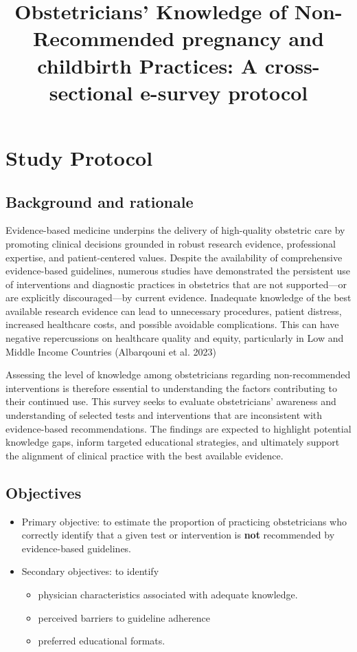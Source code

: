 \documentclass[
  letterpaper,
  DIV=11,
  numbers=noendperiod]{scrartcl}
\title{Obstetricians' Knowledge of Non-Recommended pregnancy and
childbirth Practices: A cross-sectional e-survey protocol}
\author{}
\date{}
\begin{document}
\maketitle


\section{Study Protocol}\label{study-protocol}

\subsection{Background and rationale}\label{background-and-rationale}

Evidence-based medicine underpins the delivery of high-quality obstetric
care by promoting clinical decisions grounded in robust research
evidence, professional expertise, and patient-centered values. Despite
the availability of comprehensive evidence-based guidelines, numerous
studies have demonstrated the persistent use of interventions and
diagnostic practices in obstetrics that are not supported---or are
explicitly discouraged---by current evidence. Inadequate knowledge of
the best available research evidence can lead to unnecessary procedures,
patient distress, increased healthcare costs, and possible avoidable
complications. This can have negative repercussions on healthcare
quality and equity, particularly in Low and Middle Income Countries
(Albarqouni et al. 2023)

Assessing the level of knowledge among obstetricians regarding
non-recommended interventions is therefore essential to understanding
the factors contributing to their continued use. This survey seeks to
evaluate obstetricians' awareness and understanding of selected tests
and interventions that are inconsistent with evidence-based
recommendations. The findings are expected to highlight potential
knowledge gaps, inform targeted educational strategies, and ultimately
support the alignment of clinical practice with the best available
evidence.

\subsection{Objectives}\label{objectives}

\begin{itemize}
\item
  Primary objective: to estimate the proportion of practicing
  obstetricians who correctly identify that a given test or intervention
  is \textbf{not} recommended by evidence-based guidelines.
\item
  Secondary objectives: to identify

  \begin{itemize}
  \item
    physician characteristics associated with adequate knowledge.
  \item
    perceived barriers to guideline adherence
  \item
    preferred educational formats.
  \end{itemize}
\end{itemize}
\end{document}
